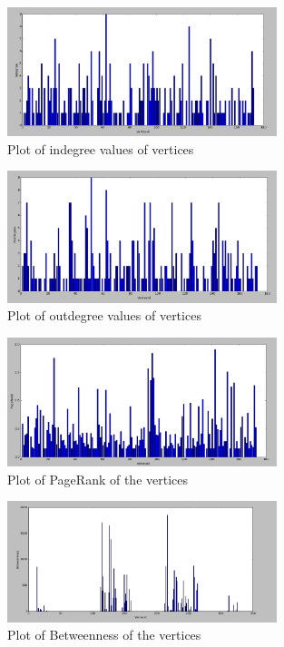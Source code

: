 \begin{figure}[!ht]
	\centering
	\includegraphics[width=0.7\textwidth]{images/indegree_plot.png}
	\caption{ Plot of indegree values of vertices}
	\label{:Indegree Plot}
\end{figure} 
\begin{figure}[!ht]
	\centering
	\includegraphics[width=0.7\textwidth]{images/outdegree_plot.png}
	\caption{ Plot of outdegree values of vertices}
	\label{:Outdegree Plot}
\end{figure} 
\begin{figure}[!ht]
	\centering
	\includegraphics[width=0.7\textwidth]{images/pagerank_plot.png}
	\caption{ Plot of PageRank of the vertices}
	\label{:PageRank Plot}
\end{figure} 
\begin{figure}[!ht]
	\centering
	\includegraphics[width=0.7\textwidth]{images/betweenness_plot.png}
	\caption{ Plot of Betweenness of the vertices}
	\label{:Betweenness Plot}
\end{figure}
\FloatBarrier

